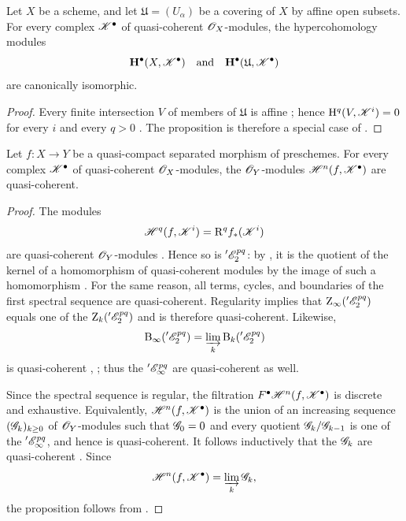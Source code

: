 \begin{proposition}[6.2.2]
\label{III.6.2.2}
Let $X$ be a scheme, and let $\mathfrak{U}=(U_\alpha)$ be a
covering of $X$ by affine open subsets.  For every complex
$\mathscr{K}^\bullet$ of quasi-coherent $\mathscr{O}_X$-modules, the
hypercohomology modules
\[
  \mathbf{H}^\bullet(X,\mathscr{K}^\bullet)
  \quad\text{and}\quad
  \mathbf{H}^\bullet(\mathfrak{U},\mathscr{K}^\bullet)
\]
are canonically isomorphic.
\end{proposition}

\begin{proof}
Every finite intersection $V$ of members of $\mathfrak{U}$ is
affine ; hence
$\mathrm H^q(V,\mathscr{K}^i)=0$ for every $i$ and every $q>0$
.  The proposition is therefore a special case of
.
\end{proof}

\begin{proposition}[6.2.3]
\label{III.6.2.3}
Let $f:X\to Y$ be a quasi-compact separated morphism of
preschemes.  For every complex $\mathscr{K}^\bullet$ of quasi-coherent
$\mathscr{O}_X$-modules, the $\mathscr{O}_Y$-modules
$\mathscr{H}^n(f,\mathscr{K}^\bullet)$ are quasi-coherent.
\end{proposition}

\begin{proof}
The modules
\[
  \mathscr{H}^q(f,\mathscr{K}^i)=\mathrm R^qf_*(\mathscr{K}^i)
\]
are quasi-coherent $\mathscr{O}_Y$-modules .  Hence so
is $'\mathscr{E}_2^{pq}$: by , it is the quotient of
the kernel of a homomorphism of quasi-coherent modules by the image
of such a homomorphism .  For the same reason, all
terms, cycles, and boundaries of the first spectral sequence are
quasi-coherent.  Regularity implies that
$\mathrm{Z}_\infty('\mathscr{E}_2^{pq})$ equals one of the
$\mathrm{Z}_k('\mathscr{E}_2^{pq})$ and is therefore quasi-coherent.
Likewise,
\[
  \mathrm{B}_\infty('\mathscr{E}_2^{pq})
  =
  \varinjlim_k\mathrm{B}_k('\mathscr{E}_2^{pq})
\]
is quasi-coherent , ; thus the
$'\mathscr{E}_\infty^{pq}$ are quasi-coherent as well.

Since the spectral sequence is regular, the filtration
$F^\bullet\mathscr{H}^n(f,\mathscr{K}^\bullet)$ is discrete and
exhaustive.  Equivalently,
$\mathscr{H}^n(f,\mathscr{K}^\bullet)$ is the union of an increasing
sequence $(\mathscr{G}_k)_{k\geq0}$ of $\mathscr{O}_Y$-modules such that
$\mathscr{G}_0=0$ and every quotient
$\mathscr{G}_k/\mathscr{G}_{k-1}$ is one of the
$'\mathscr{E}_\infty^{pq}$, and hence is quasi-coherent.  It follows
inductively that the $\mathscr{G}_k$ are quasi-coherent
.  Since
\[
  \mathscr{H}^n(f,\mathscr{K}^\bullet)
  =
  \varinjlim_k\mathscr{G}_k,
\]
the proposition follows from .
\end{proof}

